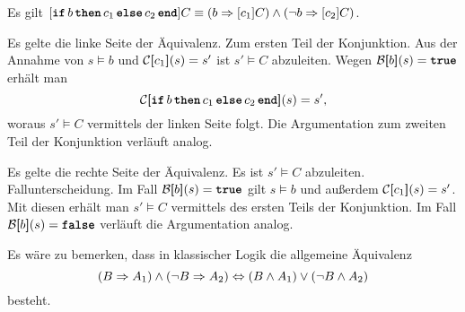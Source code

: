 \begin{Satz}
Es gilt $[\kw{if}\,b\,\kw{then}\,c_1\,\kw{else}\,c_2\,\kw{end}]C\equiv
(b\cond [c_1]C)\land (\lnot b\cond [c_2]C)$.
\end{Satz}
\begin{Beweis}
Es gelte die linke Seite der Äquivalenz. Zum ersten Teil der Konjunktion.
Aus der Annahme von $s\models b$ und $\mathcal C[\hspace{-2.6pt}[c_1]\hspace{-2.4pt}](s) = s'$ ist
$s'\models C$ abzuleiten. Wegen $\evB\qb{b}(s) = \kw{true}$ erhält man
\[\evC\qb{\kw{if}\,b\,\kw{then}\,c_1\,\kw{else}\,c_2\,\kw{end}}(s) = s',\]
woraus $s'\models C$ vermittels der linken Seite folgt. Die Argumentation
zum zweiten Teil der Konjunktion verläuft analog.

Es gelte die rechte Seite der Äquivalenz. Es ist $s'\models C$
abzuleiten. Fallunterscheidung. Im Fall $\evB\qb{b}(s) = \kw{true}$
gilt $s\models b$ und außerdem $\mathcal C[\hspace{-2.6pt}[c_1]\hspace{-2.4pt}](s) = s'$. Mit
diesen erhält man $s'\models C$ vermittels des ersten Teils der
Konjunktion. Im Fall $\evB\qb{b}(s) = \kw{false}$ verläuft
die Argumentation analog.\,\qedsymbol
\end{Beweis}

\noindent
Es wäre zu bemerken, dass in klassischer Logik die allgemeine Äquivalenz
\[(B\Rightarrow A_1)\land (\lnot B\Rightarrow A_2)\Leftrightarrow
(B\land A_1)\lor (\lnot B\land A_2)\]
besteht.
